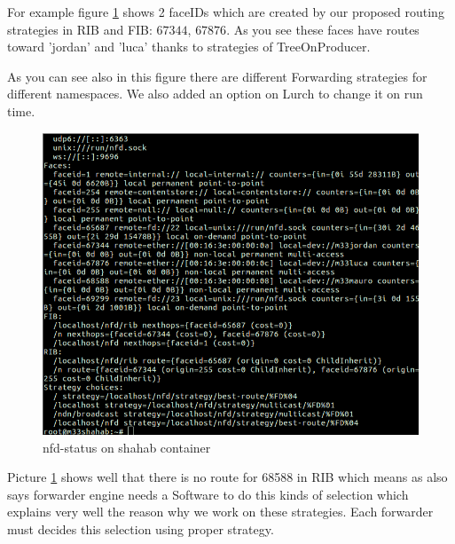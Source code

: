 For example figure \ref{nfd} shows 2 faceIDs which are created by our proposed routing strategies in RIB and FIB: $67344$, $67876$. As you see these faces have routes toward 'jordan' and 'luca' thanks to strategies of TreeOnProducer.   

As you can see also in this figure there are different Forwarding strategies for different namespaces. We also added an option on Lurch to change it on run time.



\begin{figure}[H]

\begin{center}

\includegraphics[scale = 0.35]{Pictures/nfd.png}

\caption{nfd-status on shahab container} \label{nfd} 

\end{center}

\end{figure}


Picture \ref{nfd} shows well that there is no route for 68588 in RIB which means as \cite{jacobson} also says forwarder engine needs a Software to do this kinds of selection which explains very well the reason why we work on these strategies. Each forwarder must decides this selection using proper strategy. 

